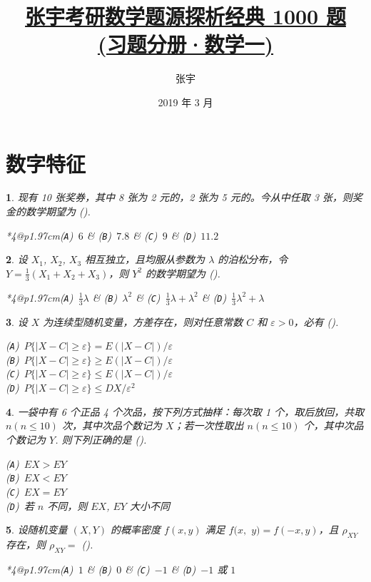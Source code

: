 \documentclass[openany,twocolumn]{ctexbook}
\title{\href{https://github.com/sikouhjw/zhangyu1000}{张宇考研数学题源探析经典 1000 题\\(习题分册·数学一)}}
\author{张宇}
\date{2019 年 3 月}
\makeatletter
\numberwithin{figure}{section}
\theoremstyle{change}
\theoremstyle{change}
\newtheorem{titwo}{}[chapter]
\def\kuo{ \mbox{(\hspace{1pc})}}
\newcommand{\fourch}[4]{\noindent\begin{tabular}{*{4}{@{}p{1.97cm}}}(\texttt{A})~#1 & (\texttt{B})~#2 & (\texttt{C})~#3 & (\texttt{D})~#4\end{tabular}} %
\newcommand{\onech}[4]{\noindent(\texttt{A})~#1 \\ (\texttt{B})~#2 \\ (\texttt{C})~#3 \\ (\texttt{D})~#4}  %
\def\leq{\leqslant}
\def\geq{\geqslant}
\makeatother
\begin{document}
	
	\section{数字特征}
	\begin{titwo}
		现有 10 张奖券，其中 8 张为 2 元的，2 张为 5 元的。今从中任取 3 张，则奖金的数学期望为 \kuo.

		\fourch{$6$}{$7.8$}{$9$}{$11.2$}
	\end{titwo}

	\begin{titwo}
		设 $X_{1}$, $X_{2}$, $X_{3}$ 相互独立，且均服从参数为 $\lambda$ 的泊松分布，令 $Y = \frac{1}{3} (X_{1} + X_{2} + X_{3})$，则 $Y^{2}$ 的数学期望为 \kuo.

		\fourch{$\frac{1}{3} \lambda$}{$\lambda^{2}$}{$\frac{1}{3} \lambda + \lambda^{2}$}{$\frac{1}{3} \lambda^{2} + \lambda$}
	\end{titwo}

	\begin{titwo}
		设 $X$ 为连续型随机变量，方差存在，则对任意常数 $C$ 和 $\varepsilon > 0$，必有 \kuo.

		\onech{$P\{ |X - C| \geq \varepsilon \} = E(|X - C|)/\varepsilon$}%
		{$P\{ |X - C| \geq \varepsilon \} \geq E(|X - C|)/\varepsilon$}%
		{$P\{ |X - C| \geq \varepsilon \} \leq E(|X - C|)/\varepsilon$}%
		{$P\{ |X - C| \geq \varepsilon \} \leq DX/\varepsilon^{2}$}
	\end{titwo}

	\begin{titwo}
		一袋中有 6 个正品 4 个次品，按下列方式抽样：每次取 1 个，取后放回，共取 $n(n \leq 10)$ 次，其中次品个数记为 $X$；若一次性取出 $n(n \leq 10)$ 个，其中次品个数记为 $Y$. 则下列正确的是 \kuo.

		\onech{$EX > EY$}{$EX < EY$}{$EX = EY$}{若 $n$ 不同，则 $EX$, $EY$ 大小不同}
	\end{titwo}

	\begin{titwo}
		设随机变量 $(X,Y)$ 的概率密度 $f(x,y)$ 满足 $f(x,$ $y) = f(-x,y)$，且 $\rho_{XY}$ 存在，则 $\rho_{XY} = $ \kuo.

		\fourch{$1$}{$0$}{$-1$}{$-1$ 或 $1$}
	\end{titwo}
\end{document}
